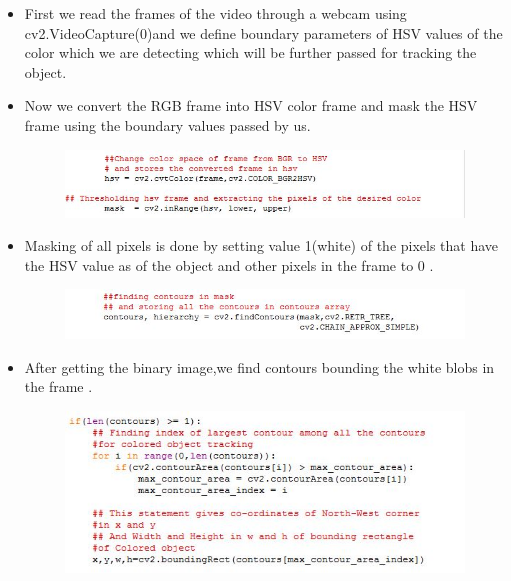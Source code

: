 \documentclass[11pt,a4paper]{article}
\begin{document}
	\begin{itemize}
		\item First we read the frames of the video through a webcam using cv2.VideoCapture(0)and we define boundary parameters of HSV values of the color which we are detecting which will be further passed for tracking the object.
		
		\item Now we convert the RGB frame into HSV color frame and mask the HSV frame using the boundary values passed by us.
		\begin{figure}[h!]
		\includegraphics[scale=0.9]{Capture.jpg}	
		\centering
		\end{figure}
		
		\item Masking of all pixels is done by setting value 1(white) of the pixels that have the HSV value as of the object and other pixels in the frame to 0 .
		\begin{figure}[h!]
		\includegraphics[scale=0.9]{Capture5.jpg}	
		\centering
		\end{figure}
		
		\item After getting the binary image,we find contours bounding the white blobs in the frame .
		\begin{figure}[h!]
			\includegraphics[scale=0.9]{Capture6.jpg}	
		\end{figure}


\end{itemize}
\end{document}
